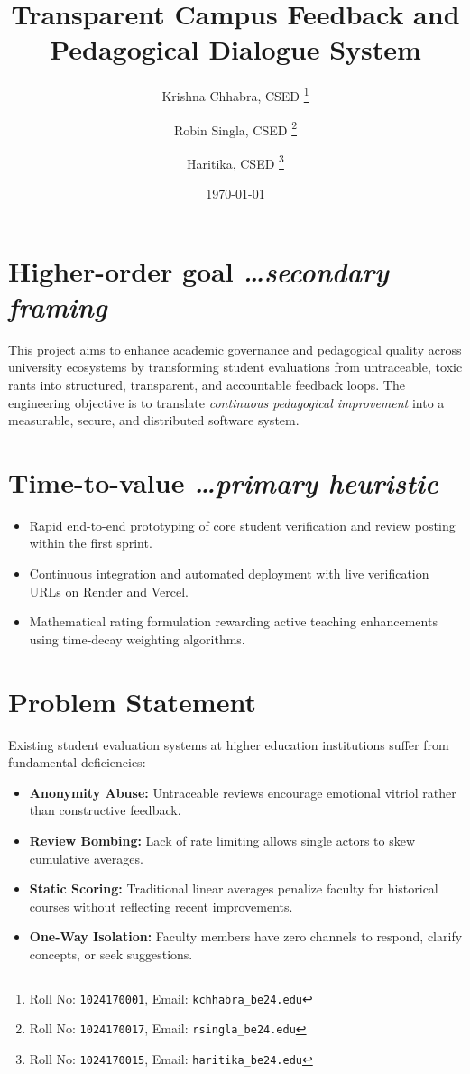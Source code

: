 \documentclass[11pt,a4paper]{article}
\title{Transparent Campus Feedback and Pedagogical Dialogue System}
\author{
  Krishna Chhabra, CSED%
  \thanks{Roll No: \texttt{1024170001}, %
    Email: \texttt{kchhabra\_be24\@thapar.edu}}
  \and 
  Robin Singla, CSED%
  \thanks{Roll No: \texttt{1024170017}, %
    Email: \texttt{rsingla\_be24\@thapar.edu}}
  \and 
  Haritika, CSED%
  \thanks{Roll No: \texttt{1024170015}, %
    Email: \texttt{haritika\_be24\@thapar.edu}}
}
\date{\today}
\newcommand{\BvrHint}[1]{%
  {\normalfont\normalsize\itshape\hfill #1}}
\begin{document}
\maketitle

\section{Higher-order goal%
  \BvrHint{\ldots secondary framing}}
This project aims to enhance academic governance and pedagogical quality across university ecosystems by transforming student evaluations from untraceable, toxic rants into structured, transparent, and accountable feedback loops. The engineering objective is to translate \emph{continuous pedagogical improvement} into a measurable, secure, and distributed software system.

\section{Time-to-value %
\BvrHint{\ldots primary heuristic}}
\begin{itemize}[leftmargin=0.7cm]
    \item Rapid end-to-end prototyping of core student verification and review posting within the first sprint.
    \item Continuous integration and automated deployment with live verification URLs on Render and Vercel.
    \item Mathematical rating formulation rewarding active teaching enhancements using time-decay weighting algorithms.
\end{itemize}

\section{Problem Statement}
Existing student evaluation systems at higher education institutions suffer from fundamental deficiencies:
\begin{itemize}[leftmargin=0.7cm]
    \item \textbf{Anonymity Abuse:} Untraceable reviews encourage emotional vitriol rather than constructive feedback.
    \item \textbf{Review Bombing:} Lack of rate limiting allows single actors to skew cumulative averages.
    \item \textbf{Static Scoring:} Traditional linear averages penalize faculty for historical courses without reflecting recent improvements.
    \item \textbf{One-Way Isolation:} Faculty members have zero channels to respond, clarify concepts, or seek suggestions.
\end{itemize}
\end{document}
